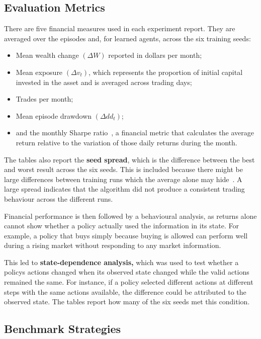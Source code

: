 \subsection{Evaluation Metrics}

There are five financial measures used in each experiment report. They
are averaged over the episodes and, for learned agents, across the six
training seeds:

\begin{itemize}
\item
  Mean wealth change \((\Delta W)\) reported in dollars per month;
\item
  Mean exposure \((\Delta v_{t})\), which represents the proportion of
  initial capital invested in the asset and is averaged across trading
  days;
\item
  Trades per month;
\item
  Mean episode drawdown \((\Delta{dd}_{t})\);
\item
  and the monthly Sharpe ratio~\cite{sharpe1994}, a financial metric that calculates the
  average return relative to the variation of those daily returns during
  the month.
\end{itemize}

The tables also report the \textbf{seed spread}, which is the difference
between the best and worst result across the six seeds. This is included
because there might be large differences between training runs which the
average alone may hide~\cite{henderson2018}. A large spread indicates that the algorithm did
not produce a consistent trading behaviour across the different runs.

Financial performance is then followed by a behavioural analysis, as
returns alone cannot show whether a policy actually used the information
in its state. For example, a policy that buys simply because buying is
allowed can perform well during a rising market without responding to
any market information.

This led to \textbf{state-dependence analysis,} which was used to test
whether a policy\textquotesingle s actions changed when its observed
state changed while the valid actions remained the same. For instance,
if a policy selected different actions at different steps with the same
actions available, the difference could be attributed to the observed
state. The tables report how many of the six seeds met this condition.

\subsection{Benchmark Strategies}

